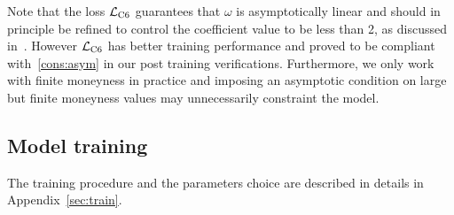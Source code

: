 Note that the loss ${\mathcal L}_{\rm C6}$ guarantees that $\omega$ is asymptotically linear and should in principle be refined to control the coefficient value to be less than 2, as discussed in~\cite{lee2004moment}.
However ${\mathcal L}_{\rm C6}$ has better training performance and proved to be compliant with~\ref{cons:asym} in our post training verifications.
Furthermore, we only work with finite moneyness in practice and imposing an asymptotic condition on large but finite moneyness values may unnecessarily constraint the model.

\subsection{Model training}

The training procedure and the parameters choice are described in details in Appendix~\ref{sec:train}.